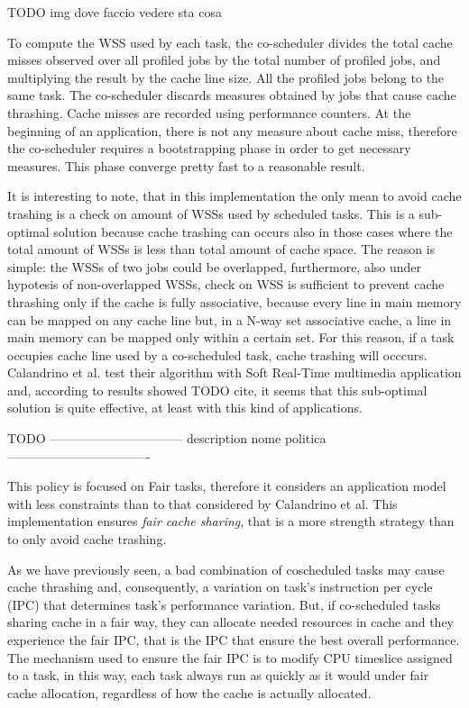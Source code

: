 TODO img dove faccio vedere sta cosa

To compute the WSS used by each task, the co-scheduler divides the total cache misses observed over all profiled jobs by the total number of profiled jobs, 
and multiplying the result by the cache line size. All the profiled jobs belong to the same task. The co-scheduler discards measures obtained by jobs that 
cause cache thrashing. Cache misses are recorded using performance counters. At the beginning of an application, there is not any measure about cache miss, 
therefore the co-scheduler requires a bootstrapping phase in order to get necessary measures. This phase converge pretty fast to a reasonable result.

It is interesting to note, that in this implementation the only mean to avoid cache trashing is a check on amount of WSSs used by scheduled tasks.
This is a sub-optimal solution because cache trashing can occurs also in those cases where the total amount of WSSs is less than total amount of cache
space. The reason is simple: the WSSs of two jobs could be overlapped, furthermore, also under hypotesis of non-overlapped WSSs, check on WSS is sufficient
to prevent cache thrashing only if the cache is fully associative, because every line in main memory can be mapped on any cache line but, in a N-way 
set associative cache, a line in main memory can be mapped only within a certain set. For this reason, if a task occupies cache line used by a co-scheduled 
task, cache trashing will occcurs. Calandrino et al. test their algorithm with Soft Real-Time multimedia application and, according to results showed 
TODO cite, it seems that this sub-optimal solution is quite effective, at least with this kind of applications.

TODO -------------------------------- description nome politica ----------------------------------

This policy is focused on Fair tasks, therefore it considers an application model with less constraints than to that considered by
Calandrino et al. This implementation ensures \textit{fair cache sharing}, that is a more strength strategy than to only avoid cache trashing.

As we have previously seen, a bad combination of coscheduled tasks may cause cache thrashing and, consequently, a variation on task's instruction per cycle
(IPC) that determines task's performance variation. But, if co-scheduled tasks sharing cache in a fair way, they can allocate needed resources in cache and
they experience the fair IPC, that is the IPC that ensure the best overall performance. The mechanism used to ensure the fair IPC is to modify CPU timeslice 
assigned to a task, in this way, each task always run as quickly as it would under fair cache allocation, regardless of how the cache is actually allocated.

